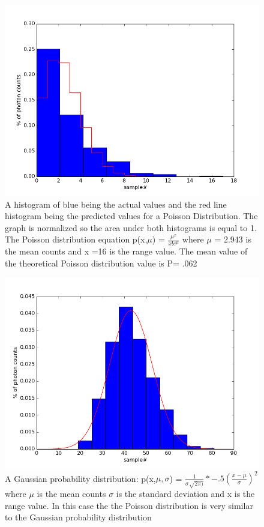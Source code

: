 \documentclass[12 pt,twoside]{article}
\begin{document}
\begin{center}
\begin{figure}[!hb]
\includegraphics[scale=0.7]{figure_6}
\caption{\small A histogram of blue being the actual values and the red line histogram being the predicted values for a Poisson Distribution. The graph is normalized so the area under both histograms is equal to 1. The Poisson distribution equation p(x,$\mu$) = $\frac{\mu^x}{x!e^\mu}$ where $\mu$ = 2.943 is the mean counts and x =16 is the range value. The mean value of the theoretical Poisson distribution value is P= .062}
\end{figure}
\end{center}

\begin{center}
\begin{figure}[!hb]
\includegraphics[scale=0.7]{figure_7}
\caption{\small A Gaussian probability distribution: p(x,$\mu,\sigma$) = $\frac{1}{\sigma\sqrt{2\pi)}}*-.5( \frac{x-\mu}{\sigma})^2$ where $\mu$ is the mean counts $\sigma$ is the standard deviation and  x is the range value. In this case the the Poisson distribution is very similar to the Gaussian probability distribution}
\end{figure}
\end{center}
\end{document}
